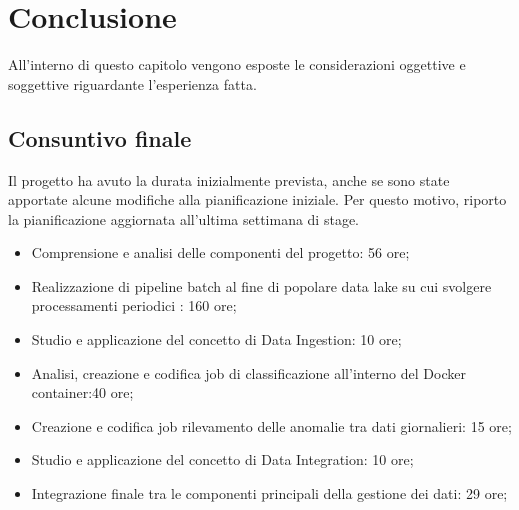\chapter{Conclusione}
\label{conlusione}
All'interno di questo capitolo vengono esposte le considerazioni oggettive e soggettive riguardante l'esperienza fatta. 
\section{Consuntivo finale}
Il progetto ha avuto la durata inizialmente prevista, anche se sono state apportate alcune modifiche alla pianificazione iniziale. Per questo motivo, riporto la pianificazione aggiornata all'ultima settimana di stage.
\begin{itemize}
	\item Comprensione e analisi delle componenti del progetto: 56 ore;
	\item Realizzazione di pipeline batch al fine di popolare data lake su cui svolgere processamenti periodici : 160 ore;
	\item Studio e applicazione del concetto di Data Ingestion: 10  ore;
	\item Analisi, creazione e codifica job di classificazione all'interno del Docker container:40 ore;
	\item Creazione e codifica job rilevamento delle anomalie tra dati giornalieri: 15 ore;
	\item Studio e applicazione del concetto di Data Integration: 10  ore;
	\item Integrazione finale tra le componenti principali della gestione dei dati: 29 ore;
\end{itemize}
